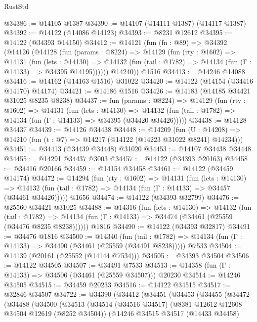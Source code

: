 \begin{lexlean}{RustStd}
\begin{coremodule}
@34386 := @14105 @1387
@34390 := @14107 (@14111 @1387) (@14117 @1387)
@34392 := @14122 (@14086 @14123)
@34393 := @8231 @12612
@34395 := @14122 (@34393 @14150)
@34412 := @14121
    (fun (fn : @89) =>
    @34392
      (@14126
        (@14128
          (fun (params : @8224) =>
          @14129
            (fun (rty : @1602) =>
            @14131
              (fun (lets : @14130) =>
              @14132 (fun (tail : @1782) => @14134 (fun (Γ : @14133) => @34395 @14195))))))
        @14240))
    @1516
@34413 := @14246 @14088
@34416 := @14162 (@14163 @1516) @31022
@34420 := @14122 (@14154 (@34416 @14170) @14174)
@34421 := @14186 @1516
@34426 := @14183 (@14185 @34421 @31025 @8235 @8238)
@34437 := fun (params : @8224) =>
  @14129
    (fun (rty : @1602) =>
    @14131
      (fun (lets : @14130) =>
      @14132 (fun (tail : @1782) => @14134 (fun (Γ : @14133) => @34395 (@34420 @34426)))))
@34438 := @14128 @34437
@34439 := @14126 @34438
@34448 := @14209
    (fun (U : @14208) => @14210 (fun (t : @7) => @14217 (@14122 (@14223 @31022 @8241) @14234)))
@34451 := @34413 (@34439 @34448) @31020
@34453 := @14107 @34438 @34448
@34455 := @14291 @34437 @3003
@34457 := @14122 (@34393 @20163)
@34458 := @34416 @20166
@34459 := @14154 @34458
@34461 := @14122 (@34459 @14174)
@34472 := @14294
    (fun (rty : @1602) =>
    @14131
      (fun (lets : @14130) =>
      @14132 (fun (tail : @1782) => @14134 (fun (Γ : @14133) => @34457 (@34461 @34426)))))
    @1656
@34474 := @14122 (@34393 @32799)
@34476 := @25560 @34421 @31025
@34488 := @14316
    (fun (lets : @14130) =>
    @14132
      (fun (tail : @1782) =>
      @14134 (fun (Γ : @14133) => @34474 (@34461 (@25559 (@34476 @8235 @8238))))))
    @1816
@34490 := @14122 (@34393 @32817)
@34491 := @34476 @1816
@34500 := @14340
    (fun (tail : @1782) => @14134 (fun (Γ : @14133) => @34490 (@34461 (@25559 (@34491 @8238)))))
    @7533
@34504 := @14139 (@20161 (@25552 (@14144 @7534)))
@34505 := @34393 @34504
@34506 := @14122 @34505
@34507 := @34491 @7533
@34513 := @14358 (fun (Γ : @14133) => @34506 (@34461 (@25559 @34507))) @20230
@34514 := @14246 @34505
@34515 := @34459 @20233
@34516 := @14122 @34515
@34517 := @32846 @34507
@34722 := @34390
    (@34412
      (@34451
        (@34453
          (@34455
            (@34472
              (@34488
                (@34500
                  (@34513
                    (@34514
                      (@34516 @34517)
                      (@8381 @12612 @12608 @34504 @12619 (@8252 @34504))
                      (@14246
                        @34515
                        @34517
                        (@14433 @34458)

\end{coremodule}
\end{lexlean}
